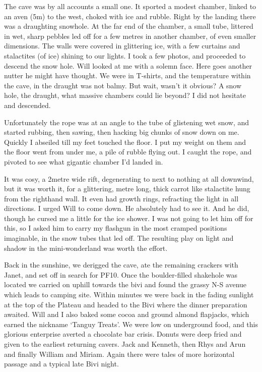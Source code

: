 The cave was by all accounts a small one. It sported a modest chamber, linked to an aven (5m) to the west, choked with ice and rubble. Right by the landing there was a draughting snowhole. At the far end of the chamber, a small tube, littered in wet, sharp pebbles led off for  a few metres in another chamber, of even smaller dimensions. The walls were covered in glittering ice, with a few curtains and stalactites (of ice) shining to our lights. I took a few photos, and proceeded to descend the snow hole. Will looked at me with a solemn face. Here goes another nutter he might have thought. We were in T-shirts, and the temperature within the cave, in the draught was not balmy. But wait, wasn’t it obvious? A snow hole, the draught, what massive chambers could lie beyond? I did not hesitate and descended.

Unfortunately the rope was at an angle to the tube of glistening wet snow, and started rubbing, then sawing, then hacking big chunks of snow down on me. Quickly I abseiled till my feet touched the floor. I put my weight on them and the floor went from under me, a pile of rubble flying out. I caught the rope, and pivoted to see what gigantic chamber I’d landed in. 

It was cosy, a 2metre wide rift, degenerating to next to nothing at all downwind, but it was worth it, for a glittering, metre long, thick carrot like stalactite hung from the righthand wall. It even had growth rings, refracting the light in all directions. I urged Will to come down. He absolutely had to see it. And he did, though he cursed me a little for the ice shower. I was not going to let him off for this, so I asked him to carry my flashgun in the most cramped positions imaginable, in the snow tubes that led off. The resulting play on light and shadow in the mini-wonderland was worth the effort. 



Back in the sunshine, we derigged the cave, ate the remaining crackers with Janet, and set off in search for PF10. Once the boulder-filled shakehole was located we carried on uphill towards the bivi and found the grassy N-S avenue which leads to camping site. Within minutes we were back in the fading sunlight at the top of the Plateau and headed to the Bivi where the dinner preparation awaited. Will and I also baked some cocoa and ground almond flapjacks, which earned the nickname ‘Tanguy Treats’. We were low on underground food, and this glorious enterprise averted a chocolate bar crisis. Donuts were deep fried and given to the earliest returning cavers. Jack and Kenneth, then Rhys and Arun and finally William and Miriam. Again there were tales of more horizontal passage and a typical late Bivi night. 



